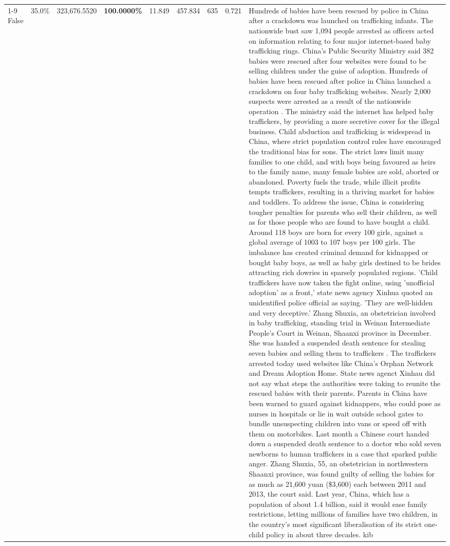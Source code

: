 \begin{table}[H]
\begin{tabular}{lllrlllll}
\cline{1-9}
False & 35.0\% & 323,676.5520 & \bfseries \color{red} 100.0000\% & 11.849 & 457.834 & 635 & 0.721 & Hundreds of babies have been rescued by police in China after a crackdown was launched on trafficking infants. The nationwide bust saw 1,094 people arrested as officers acted on information relating to four major internet-based baby trafficking rings. China's Public Security Ministry said 382 babies were rescued after four websites were found to be selling children under the guise of adoption. Hundreds of babies have been rescued after police in China launched a crackdown on four baby trafficking websites. Nearly 2,000 suspects were arrested as a result of the nationwide operation . The ministry said the internet has helped baby traffickers, by providing a more secretive cover for the illegal business. Child abduction and trafficking is widespread in China, where strict population control rules have encouraged the traditional bias for sons. The strict laws limit many families to one child, and with boys being favoured as heirs to the family name, many female babies are sold, aborted or abandoned. Poverty fuels the trade, while illicit profits tempts traffickers, resulting in a thriving market for babies and toddlers. To address the issue, China is considering tougher penalties for parents who sell their children, as well as for those people who are found to have bought a child. Around 118 boys are born for every 100 girls, against a global average of 1003 to 107 boys per 100 girls. The imbalance has created criminal demand for kidnapped or bought baby boys, as well as baby girls destined to be brides attracting rich dowries in sparsely populated regions. 'Child traffickers have now taken the fight online, using 'unofficial adoption' as a front,' state news agency Xinhua quoted an unidentified police official as saying. 'They are well-hidden and very deceptive.' Zhang Shuxia, an obstetrician involved in baby trafficking, standing trial in Weinan Intermediate People's Court in Weinan, Shaanxi province in December. She was handed a suspended death sentence for stealing seven babies and selling them to traffickers . The traffickers arrested today used websites like China's Orphan Network and Dream Adoption Home. State news agenct Xinhau did not say what steps the authorities were taking to reunite the rescued babies with their parents. Parents in China have been warned to guard against kidnappers, who could pose as nurses in hospitals or lie in wait outside school gates to bundle unsuspecting children into vans or speed off with them on motorbikes. Last month a Chinese court handed down a suspended death sentence to a doctor who sold seven newborns to human traffickers in a case that sparked public anger. Zhang Shuxia, 55, an obstetrician in northwestern Shaanxi province, was found guilty of selling the babies for as much as 21,600 yuan (\$3,600) each between 2011 and 2013, the court said. Last year, China, which has a population of about 1.4 billion, said it would ease family restrictions, letting millions of families have two children, in the country's most significant liberalisation of its strict one-child policy in about three decades. kib \\

\end{tabular}
\end{table}
